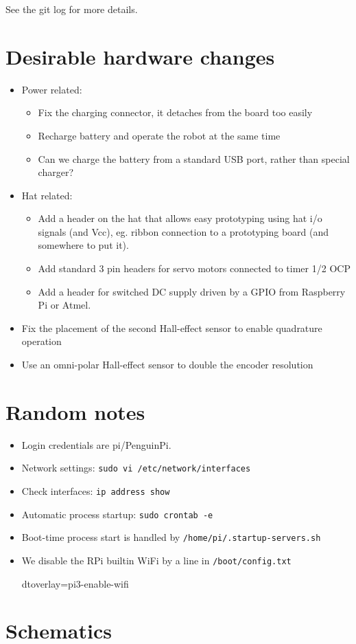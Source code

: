 \documentclass[11pt,fleqn]{article}
\begin{document}
See the git log for more details.  %

\section{Desirable hardware changes}
\begin{itemize}
\item Power related:
 \begin{itemize}
 \item Fix the charging connector, it detaches from the board too easily
 \item Recharge battery and operate the robot at the same time
 \item Can we charge the battery from a standard USB port, rather than special charger?
 \end{itemize}
\item Hat related:
\begin{itemize}
 \item Add a header on the hat that allows easy prototyping using hat i/o signals (and Vcc), eg. ribbon connection to a prototyping board (and somewhere to put it).
 \item Add standard 3 pin headers for servo motors connected to timer 1/2 OCP
 \item Add a header for switched DC supply driven by a GPIO from Raspberry Pi or Atmel.
\end{itemize}
\item Fix the placement of the second Hall-effect sensor to enable quadrature operation
\item Use an omni-polar Hall-effect sensor to double the encoder resolution
\end{itemize}

\section{Random notes}
\begin{itemize}
\item Login credentials are pi/PenguinPi.
\item Network settings: \texttt{sudo vi /etc/network/interfaces}
\item Check interfaces: \texttt{ip address show}
\item Automatic process startup: \texttt{sudo crontab -e}
\item Boot-time process start is handled by \texttt{/home/pi/.startup-servers.sh}
\item We disable the RPi builtin WiFi by a line in \texttt{/boot/config.txt}
\begin{Code}
  dtoverlay=pi3-enable-wifi
\end{Code} 
\end{itemize}


\section{Schematics}



\end{document}
